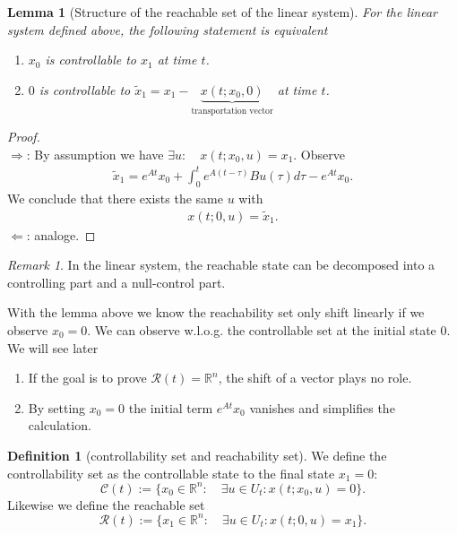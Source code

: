 \documentclass[a4paper,11pt,fleqn]{book}
\newtheorem{lemma}[theorem]{Lemma}
\theoremstyle{definition}
\newtheorem{definition}{Definition}[section]
\theoremstyle{remark}
\newtheorem*{remark}{Remark}
\begin{document}
\begin{lemma}[Structure of the reachable set of the linear system]
	For the linear system defined above, the following statement is equivalent 
	\begin{enumerate}
		\item $x_0$ is controllable to $x_1$ at time $t$. 
		\item $0$ is controllable to $\tilde{x}_1 = x_1 - \underbrace{ x(t; x_0, 0)}_{\text{transportation vector}}$ at time $t$.
	\end{enumerate}
\end{lemma}
\begin{proof}
\quad\\
$\Rightarrow$: By assumption we have $\exists u : \quad x(t; x_0, u) = x_1$. Observe
\begin{align*}
	\tilde{x}_1 = e^{At }x_0 + \int_0^t e^{A(t - \tau)} Bu (\tau) d\tau - e^{At}x_0.
\end{align*}
We conclude that there exists the same $u$ with 
\begin{align*}
	x(t; 0, u) = \tilde{x}_1. 
\end{align*}
$\Leftarrow$: analoge. 
\end{proof}

\begin{remark}
In the linear system, the reachable state can be decomposed into a controlling part and a null-control part. 	
\end{remark}


With the lemma above we know the reachability set only shift linearly if we observe $x_0 =0$. We can observe w.l.o.g. the controllable set at the initial state $0$. We will see later
\begin{enumerate}
	\item If the goal is to prove $\mathcal{R}(t) = \mathbb{R}^n$, the shift of a vector plays no role. 
	\item By setting $x_0 = 0$ the initial term $e^{At} x_0$ vanishes and simplifies the calculation. 
\end{enumerate}


\begin{definition}[controllability set and reachability set]
We define the controllability set as the controllable state to the final state $x_1 = 0$:
\begin{equation}
	\mathcal{C}(t) := \{x_0 \in \mathbb{R}^n: \quad \exists u \in U_t: x(t; x_0, u) = 0 \}.
\end{equation}
Likewise we define the reachable set
\begin{equation}
	\mathcal{R}(t):= \{x_1 \in \mathbb{R}^n: \quad \exists u \in U_t: x(t; 0, u) = x_1 \}. 
\end{equation}
\end{definition}
\end{document}
